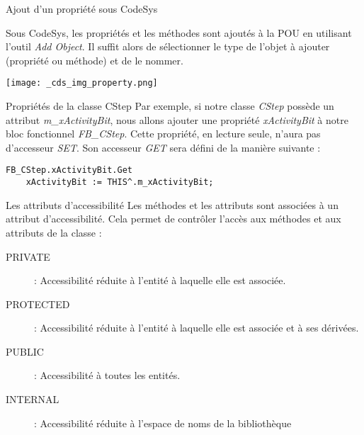 \begin{UPSTIinfor}{Ajout d'un propriété sous CodeSys}
    \begin{minipage}{.7\linewidth}
        Sous CodeSys, les propriétés et les méthodes sont ajoutés à la POU en utilisant l'outil \emph{Add Object}. Il suffit alors de sélectionner le type de l'objet à ajouter (propriété ou méthode) et de le nommer.
    \end{minipage}\hfill
    \begin{minipage}{.2\linewidth}
        \centering
        \texttt{[image: \_cds\_img\_property.png]}
    \end{minipage}    
\end{UPSTIinfor}

\begin{UPSTIidee}{Propriétés de la classe CStep}
    Par exemple, si notre classe \emph{CStep} possède un attribut \emph{m\_xActivityBit}, nous allons ajouter une propriété \emph{xActivityBit} à notre bloc fonctionnel \emph{FB\_CStep}. Cette propriété, en lecture seule, n'aura pas d'accesseur \emph{SET}. Son accesseur \emph{GET} sera défini de la manière suivante :
    \begin{lstlisting}
FB_CStep.xActivityBit.Get
    xActivityBit := THIS^.m_xActivityBit;
    \end{lstlisting}
\end{UPSTIidee}

\begin{UPSTIinfor}{Les attributs d'accessibilité}
    Les méthodes et les attributs sont associées à un attribut d'accessibilité. Cela permet de contrôler l'accès aux méthodes et aux attributs de la classe : 
    \begin{description}
        \item[PRIVATE] : Accessibilité réduite à l'entité à laquelle elle est associée.
        \item[PROTECTED] : Accessibilité réduite à l'entité à laquelle elle est associée et à ses dérivées.
        \item[PUBLIC] : Accessibilité à toutes les entités.
        \item[INTERNAL] : Accessibilité réduite à l'espace de noms de la bibliothèque
    \end{description}
\end{UPSTIinfor}
